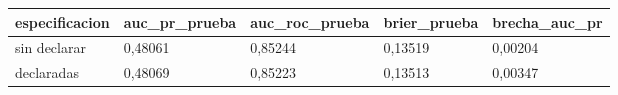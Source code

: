\begin{tabular}{lllll}
\toprule
especificacion & auc\_pr\_prueba & auc\_roc\_prueba & brier\_prueba & brecha\_auc\_pr \\
\midrule
sin declarar & 0{,}48061 & 0{,}85244 & 0{,}13519 & 0{,}00204 \\
declaradas & 0{,}48069 & 0{,}85223 & 0{,}13513 & 0{,}00347 \\
\bottomrule
\end{tabular}
